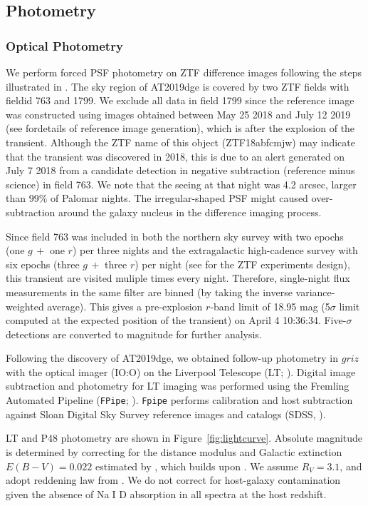 \documentclass[twocolumn]{aastex63}
\def\ion#1#2{#1$\;${\footnotesize\rm{#2}}\relax}
\begin{document}
\begin{CJK*}{UTF8}{gbsn}
\subsection{Photometry}
\subsubsection{Optical Photometry}
We perform forced PSF photometry on ZTF difference images following the steps illustrated in 
\citet{Yao2019}. The sky region of AT2019dge is covered by two ZTF fields with fieldid 763 and 
1799. We exclude all data in field 1799 since the reference image was constructed using images 
obtained between May 25 2018 and July 12 2019 (see \citealt{Masci2019} fordetails of  reference image 
generation), which is after the explosion of the transient. Although the ZTF name of this object 
(ZTF18abfcmjw) may indicate that the transient was discovered in 2018, this is due to an alert 
generated on July 7 2018 from a candidate detection in negative subtraction (reference minus science) 
in field 763. We note that the seeing at that night was 4.2 arcsec, larger than 99\% of Palomar nights. 
The irregular-shaped PSF might caused over-subtraction around the galaxy nucleus in the difference 
imaging process.

Since field 763 was included in both the northern sky survey with two epochs (one 
$g\, +$ one $r$) per three nights and the extragalactic high-cadence survey with six epochs (three 
$g\,+$ three $r$) per night (see \citealt{Bellm2019a} for the ZTF experiments design), this 
transient are visited muliple times every night. Therefore, single-night flux measurements in the same 
filter are binned (by taking the inverse variance-weighted average). This gives a pre-explosion 
$r$-band limit of 18.95 mag (5$\sigma$ limit computed at the expected position of the transient) on 
April 4 10:36:34. Five-$\sigma$ detections are converted to magnitude for further analysis.

Following the discovery of AT2019dge, we obtained follow-up photometry in $griz$ with the optical 
imager (IO:O) on the Liverpool Telescope (LT; \citealt{Steele2004}). Digital image subtraction and 
photometry for LT imaging was performed using the Fremling Automated Pipeline (\texttt{FPipe}; 
\citealt{Fremling2016}). \texttt{Fpipe} performs calibration and host subtraction against Sloan Digital 
Sky Survey reference images and catalogs (SDSS, \citealt{Alam2015}).

LT and P48 photometry are shown in Figure~\ref{fig:lightcurve}. Absolute magnitude is determined by 
correcting for the distance modulus 
and Galactic extinction $E(B-V)=0.022$ estimated by \citet{Schlafly2011}, which builds upon 
\citet{Schlegel1998}. We assume $R_V=3.1$, and adopt reddening law from \citet{Cardelli1989}. We do 
not correct for host-galaxy contamination given the absence of \ion{Na}{I} D absorption in all spectra 
at the host redshift. 


\end{CJK*}
\end{document}
